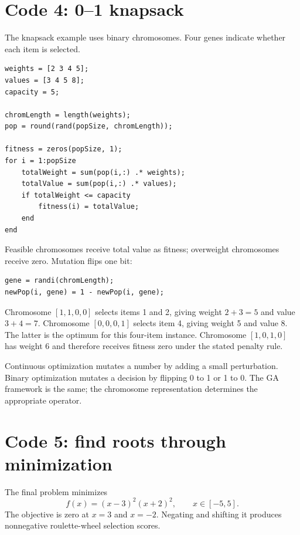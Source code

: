 \section{Code 4: 0--1 knapsack}

The knapsack example uses binary chromosomes. Four genes indicate whether each item is selected.

\begin{lstlisting}[style=mlmatlab]
weights = [2 3 4 5];
values = [3 4 5 8];
capacity = 5;

chromLength = length(weights);
pop = round(rand(popSize, chromLength));

fitness = zeros(popSize, 1);
for i = 1:popSize
    totalWeight = sum(pop(i,:) .* weights);
    totalValue = sum(pop(i,:) .* values);
    if totalWeight <= capacity
        fitness(i) = totalValue;
    end
end
\end{lstlisting}

Feasible chromosomes receive total value as fitness; overweight chromosomes receive zero. Mutation flips one bit:

\begin{lstlisting}[style=mlmatlab]
gene = randi(chromLength);
newPop(i, gene) = 1 - newPop(i, gene);
\end{lstlisting}

\begin{workedexample}
Chromosome \([1,1,0,0]\) selects items 1 and 2, giving weight \(2+3=5\) and value \(3+4=7\). Chromosome \([0,0,0,1]\) selects item 4, giving weight 5 and value 8. The latter is the optimum for this four-item instance. Chromosome \([1,0,1,0]\) has weight 6 and therefore receives fitness zero under the stated penalty rule.
\end{workedexample}

\begin{intuition}
Continuous optimization mutates a number by adding a small perturbation. Binary optimization mutates a decision by flipping 0 to 1 or 1 to 0. The GA framework is the same; the chromosome representation determines the appropriate operator.
\end{intuition}

\section{Code 5: find roots through minimization}

The final problem minimizes
\[
f(x)=(x-3)^2(x+2)^2,
\qquad x\in[-5,5].
\]
The objective is zero at \(x=3\) and \(x=-2\). Negating and shifting it produces nonnegative roulette-wheel selection scores.

